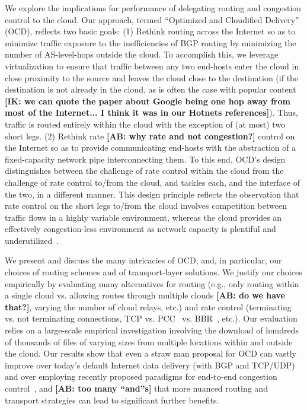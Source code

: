 \documentclass[10pt,sigconf]{acmart}
\newcommand{\mycomm}[3]{{\color{#2} \textbf{[#1: #3]}}}
\newcommand{\mycomm}[3]{}
\newcommand{\IK}[1]{\mycomm{IK}{blue}{#1}}
\newcommand{\AB}[1]{\mycomm{AB}{orange}{#1}}
\begin{document}
We explore the implications for performance of delegating routing and congestion
control to the cloud. Our approach, termed ``Optimized and Cloudified Delivery''
(OCD), reflects two basic goals: (1) Rethink routing across the Internet so as
to minimize traffic exposure to the inefficiencies of BGP routing by minimizing
the number of AS-level-hops outside the cloud. To accomplish this, we leverage
virtualization to ensure that traffic between any two end-hosts enter the cloud
in close proximity to the source and leaves the cloud close to the destination
(if the destination is not already in the cloud, as is often the case with
popular content\IK{we can quote the paper about Google being one hop away from
most of the Internet... I think it was in our Hotnets references}). Thus,
traffic is routed entirely within the cloud with the exception of (at most) two
short legs. (2) Rethink rate\AB{why rate and not congestion?} control on the
Internet so as to provide communicating end-hosts with the abstraction of a
fixed-capacity network pipe interconnecting them. To this end, OCD's design distinguishes between the challenge of rate control within the cloud from the challenge of rate control to/from the cloud, and tackles each, and the interface of the two, in a different manner. This design principle reflects the observation that rate control on the short legs to/from the cloud involves competition between traffic flows in a highly variable environment, whereas the cloud provides an effectively congestion-less environment as network capacity is plentiful and underutilized~\cite{x,y}.

We present and discuss the many intricacies of OCD, and, in particular, our
choices of routing schemes and of transport-layer solutions. We justify our
choices empirically by evaluating many alternatives for routing (e.g., only
routing within a single cloud vs. allowing routes through multiple
clouds\AB{do we have that?}, varying the number of cloud relays, etc.) and rate
control (terminating vs. not terminating connections, TCP vs. PCC~\cite{PCC} vs.
BBR~\cite{BBR}, etc.). Our evaluation relies on a large-scale empirical
investigation involving the download of hundreds of thousands of files of
varying sizes from multiple locations within and outside the cloud. Our results
show that even a straw man proposal for OCD can vastly improve over today's
default Internet data delivery (with BGP and TCP/UDP) and over employing
recently proposed paradigms for end-to-end congestion control~\cite{x,y},
and\AB{too many ``and''s} that more nuanced routing and transport strategies can
lead to significant further benefits.
\end{document}
